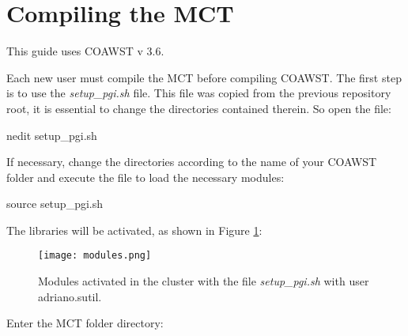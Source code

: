 \section{Compiling the MCT}
\bigskip

\begin{tcolorbox}[enhanced,
  grow to left by=0cm,%
  grow to right by=0cm,%
  enlarge top by=0cm,%
  enlarge bottom by=0cm,%
  tcbox raise base,
  boxrule=1.0pt,
  left=18mm,
  colframe=red!50!black,coltext=red!25!black,colback=red!10!white,
  overlay={\begin{tcbclipinterior}\fill[red!75!blue!50!white] (frame.south west)
    rectangle node[text=white,font=\sffamily\bfseries\footnotesize,rotate=0] {WARNING} ([xshift=18mm]frame.north west);\end{tcbclipinterior}}]
    This guide uses COAWST v 3.6.
\end{tcolorbox}
\bigskip


\noindent Each new user must compile the MCT before compiling COAWST. The first step is to use the \textit{setup\_pgi.sh} file. This file was copied from the previous 
repository root, it is essential to change the directories contained therein. So open the file:
\bigskip

\begin{bashcode}
nedit setup_pgi.sh
\end{bashcode}
\bigskip

\noindent If necessary, change the directories according to the name of your COAWST folder and execute the file to load the necessary modules:
\bigskip

\begin{bashcode}
source setup_pgi.sh
\end{bashcode}
\bigskip

\noindent The libraries will be activated, as shown in Figure \textcolor{bleu_cite}{\ref{modulos}}:
\bigskip


\begin{figure}[H]
    \centering
    \texttt{[image: modules.png]}
    \caption{Modules activated in the cluster with the file \textit{setup\_pgi.sh} with user adriano.sutil.}
    \label{modulos}
\end{figure}
\bigskip

\noindent Enter the MCT folder directory:
\bigskip

